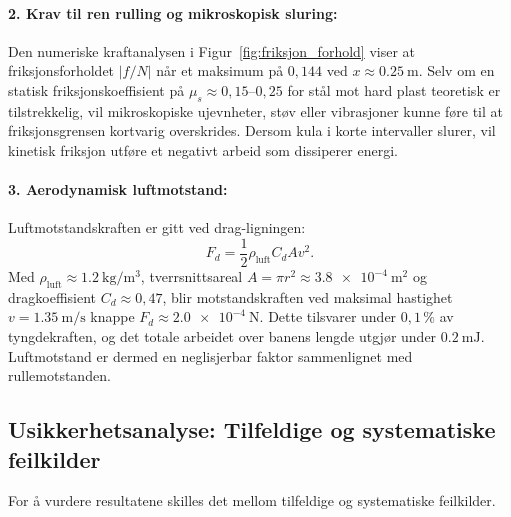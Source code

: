 \documentclass[11pt,a4paper]{article}
\begin{document}
\paragraph{2. Krav til ren rulling og mikroskopisk sluring:}
Den numeriske kraftanalysen i Figur~\ref{fig:friksjon_forhold} viser at friksjonsforholdet $|f/N|$ når et maksimum på $0{,}144$ ved $x \approx \SI{0,25}{\meter}$. Selv om en statisk friksjonskoeffisient på $\mu_s \approx 0{,}15$--$0{,}25$ for stål mot hard plast teoretisk er tilstrekkelig, vil mikroskopiske ujevnheter, støv eller vibrasjoner kunne føre til at friksjonsgrensen kortvarig overskrides. Dersom kula i korte intervaller slurer, vil kinetisk friksjon utføre et negativt arbeid som dissiperer energi.

\paragraph{3. Aerodynamisk luftmotstand:}
Luftmotstandskraften er gitt ved drag-ligningen:
\begin{equation}
    F_d = \frac{1}{2}\rho_{\text{luft}} C_d A v^2.
\end{equation}
Med $\rho_{\text{luft}} \approx \SI{1,2}{\kilo\gram\per\cubic\meter}$, tverrsnittsareal $A = \pi r^2 \approx \SI{3,8e-4}{\square\meter}$ og dragkoeffisient $C_d \approx 0{,}47$, blir motstandskraften ved maksimal hastighet $v = \SI{1,35}{\meter\per\second}$ knappe $F_d \approx \SI{2,0e-4}{\newton}$. Dette tilsvarer under $0{,}1\,\%$ av tyngdekraften, og det totale arbeidet over banens lengde utgjør under $\SI{0,2}{\milli\joule}$. Luftmotstand er dermed en neglisjerbar faktor sammenlignet med rullemotstanden.

\subsection{Usikkerhetsanalyse: Tilfeldige og systematiske feilkilder}
For å vurdere resultatene skilles det mellom tilfeldige og systematiske feilkilder.
\end{document}

